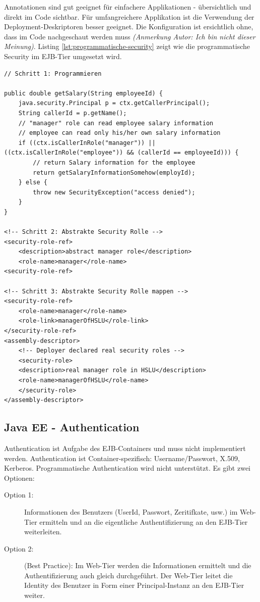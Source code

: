 Annotationen sind gut geeignet für einfachere Applikationen - übersichtlich und direkt im Code sichtbar. Für umfangreichere Applikation ist die Verwendung der Deployment-Deskriptoren besser geeignet. Die Konfiguration ist ersichtlich ohne, dass im Code nachgeschaut werden muss \emph{(Anmerkung Autor: Ich bin nicht dieser Meinung)}. Listing \ref{lst:programmatische-security} zeigt wie die programmatische Security im EJB-Tier umgesetzt wird.

\begin{lstlisting}[caption=Programmatische Security im EJB-Tier, label=lst:programmatische-security]
// Schritt 1: Programmieren

public double getSalary(String employeeId) {
	java.security.Principal p = ctx.getCallerPrincipal();
	String callerId = p.getName();
	// "manager" role can read employee salary information
	// employee can read only his/her own salary information
	if ((ctx.isCallerInRole("manager")) || ((ctx.isCallerInRole("employee")) && (callerId == employeeId))) {
		// return Salary information for the employee
		return getSalaryInformationSomehow(employId);
	} else {
		throw new SecurityException("access denied");
	}
}

<!-- Schritt 2: Abstrakte Security Rolle -->
<security-role-ref>
	<description>abstract manager role</description>
	<role-name>manager</role-name>
<security-role-ref>

<!-- Schritt 3: Abstrakte Security Rolle mappen -->
<security-role-ref>
	<role-name>manager</role-name>
	<role-link>managerOfHSLU</role-link>
</security-role-ref>
<assembly-descriptor>
	<!-- Deployer declared real security roles -->
	<security-role>
	<description>real manager role in HSLU</description>
	<role-name>managerOfHSLU</role-name>
	</security-role>
</assembly-descriptor>
\end{lstlisting}

\subsection{Java EE - Authentication}
Authentication ist Aufgabe des EJB-Containers und muss nicht implementiert werden. Authentication ist Container-spezifisch: Username/Passwort, X.509, Kerberos. Programmatische Authentication wird nicht unterstützt. Es gibt zwei Optionen:

\begin{description}
	\item[Option 1:] Informationen des Benutzers (UserId, Passwort, Zeritifkate, usw.) im Web-Tier ermitteln und an die eigentliche Authentifizierung an den EJB-Tier weiterleiten. 
	\item[Option 2:] (Best Practice): Im Web-Tier werden die Informationen ermittelt und die Authentifizierung auch gleich durchgeführt. Der Web-Tier leitet die Identity des Benutzer in Form einer Principal-Instanz an den EJB-Tier weiter. 
\end{description}


